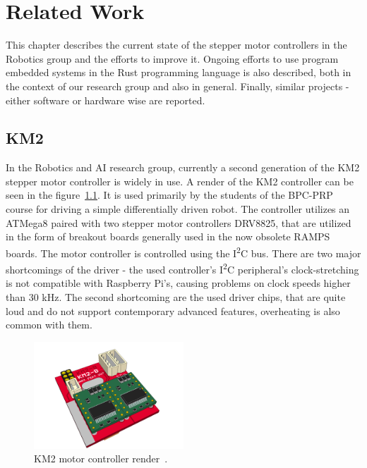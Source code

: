 \chapter{Related Work}
\label{ch:related_work}
This chapter describes the current state of the stepper motor controllers in the Robotics group and the efforts to improve it.
Ongoing efforts to use program embedded systems in the Rust programming language is also described, both in the context of our research group and also in general.
Finally, similar projects - either software or hardware wise are reported.

\section{KM2}
\label{sec:km2}
In the Robotics and AI research group, currently a second generation of the KM2 stepper motor controller is widely in use.
A render of the KM2 controller can be seen in the figure~\ref{fig:km2render}.
It is used primarily by the students of the BPC-PRP course for driving a simple differentially driven robot.
The controller utilizes an ATMega8 paired with two stepper motor controllers DRV8825, that are utilized in the form of breakout boards generally used in the now obsolete RAMPS boards.
The motor controller is controlled using the I\textsuperscript{2}C bus.
There are two major shortcomings of the driver - the used controller's I\textsuperscript{2}C peripheral's clock-stretching is not compatible with Raspberry Pi's, causing problems on clock speeds higher than 30 kHz.
The second shortcoming are the used driver chips, that are quite loud and do not support contemporary advanced features, overheating is also common with them.

\begin{figure}[H]
    \centering
    \includegraphics[width=0.5\textwidth]{obrazky/km2render}
    \caption{KM2 motor controller render~\cite{burian_km2renderpng_nodate}.}
    \label{fig:km2render}
\end{figure}

